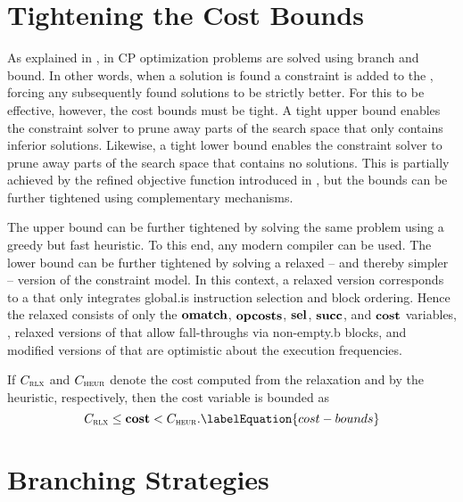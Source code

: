 \section{Tightening the Cost Bounds}

As explained in , in \gls{CP} optimization
problems are solved using \gls{branch and bound}.
%
In other words, when a \gls{solution} is found a \gls{constraint} is added to
the , forcing any subsequently found \glspl{solution}
to be strictly better.
%
For this to be effective, however, the cost bounds must be tight.
%
A tight upper bound enables the \gls{constraint solver} to prune away parts of
the \gls{search space} that only contains inferior \glspl{solution}.
%
Likewise, a tight lower bound enables the \gls{constraint solver} to prune away
parts of the \gls{search space} that contains no \glspl{solution}.
%
This is partially achieved by the refined \gls{objective function} introduced in
, but the bounds can be further
tightened using complementary mechanisms.

The upper bound can be further tightened by solving the same problem using a
greedy but fast heuristic.
%
To this end, any modern \gls{compiler} can be used.
%
The lower bound can be further tightened by solving a relaxed -- and thereby
simpler -- version of the \gls{constraint model}.
%
In this context, a relaxed version corresponds to a 
that only integrates \gls{global.is} \gls{instruction selection} and \gls{block
  ordering}.
%
Hence the relaxed  consists of only the
$\mVar{omatch}$, $\mVar{opcosts}$, $\mVar{sel}$, $\mVar{succ}$, and
$\mVar{cost}$ variables, , relaxed versions of
 that allow fall-throughs via
non-\gls{empty.b} \glspl{block}, and modified versions of
 that
are optimistic about the execution frequencies.

If $C_{\textsc{\textrm{rlx}}}$ and $C_{\textsc{\textrm{heur}}}$ denote the cost computed from the
relaxation and by the heuristic, respectively, then the \gls{cost variable} is
bounded as
%
\begin{equation}
  \mRelaxedCost \leq \mVar{cost} < \mHeuristicCost.
  \labelEquation{cost-bounds}
\end{equation}


\section{Branching Strategies}

